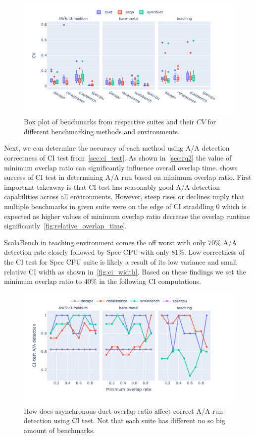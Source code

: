 \begin{figure}
	\centering
	\includegraphics[width=1\linewidth]{./figures/cv.pdf}
	\caption{
		Box plot of benchmarks from respective suites and their $CV$ for different benchmarking methods and environments.
	}
	\label{fig:cv}
\end{figure}

Next, we can determine the accuracy of each method using A/A detection correctness of CI test from~\cref{sec:ci_test}.
As shown in~\cref{sec:rq2} the value of minimum overlap ratio can significantly influence overall overlap time.
 shows success of CI test in determining A/A run based on minimum overlap ratio.
First important takeaway is that CI test has reasonably good A/A detection capabilities across all environments.
However, steep rises or declines imply that multiple benchmarks in given suite were on the edge of CI straddling $0$ which is expected as higher values of minimum overlap ratio decrease the overlap runtime significantly~\ref{fig:relative_overlap_time}.

ScalaBench in teaching environment comes the off worst with only $70\%$ A/A detection rate closely followed by Spec CPU with only $81\%$.
Low correctness of the CI test for Spec CPU suite is likely a result of its low variance and small relative CI width as shown in~\cref{fig:ci_width}.
Based on these findings we set the minimum overlap ratio to $40\%$ in the following CI computations.

\begin{figure}
	\centering
	\includegraphics[width=1\linewidth]{./figures/citest_aa_match_by_overlap.pdf}
	\caption{
		How does asynchronous duet overlap ratio affect correct A/A run detection using CI test.
		Not that each suite has different no so big amount of benchmarks.
	}
	\label{fig:citest_overlap_aa}
\end{figure}

